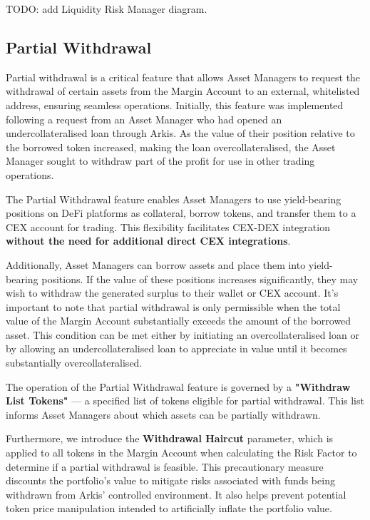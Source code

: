 \documentclass[conference]{IEEEtran}
\begin{document}
TODO: add Liquidity Risk Manager diagram.


\subsection{Partial Withdrawal}

Partial withdrawal is a critical feature that allows Asset Managers to request the withdrawal of certain assets from the Margin Account to an external, whitelisted address, ensuring seamless operations. Initially, this feature was implemented following a request from an Asset Manager who had opened an undercollateralised loan through Arkis. As the value of their position relative to the borrowed token increased, making the loan overcollateralised, the Asset Manager sought to withdraw part of the profit for use in other trading operations.

The Partial Withdrawal feature enables Asset Managers to use yield-bearing positions on DeFi platforms as collateral, borrow tokens, and transfer them to a CEX account for trading. This flexibility facilitates CEX-DEX integration \textbf{without the need for additional direct CEX integrations}.

Additionally, Asset Managers can borrow assets and place them into yield-bearing positions. If the value of these positions increases significantly, they may wish to withdraw the generated surplus to their wallet or CEX account. It's important to note that partial withdrawal is only permissible when the total value of the Margin Account substantially exceeds the amount of the borrowed asset. This condition can be met either by initiating an overcollateralised loan or by allowing an undercollateralised loan to appreciate in value until it becomes substantially overcollateralised.

The operation of the Partial Withdrawal feature is governed by a \textbf{"Withdraw List Tokens"} — a specified list of tokens eligible for partial withdrawal. This list informs Asset Managers about which assets can be partially withdrawn.

Furthermore, we introduce the \textbf{Withdrawal Haircut} parameter, which is applied to all tokens in the Margin Account when calculating the Risk Factor to determine if a partial withdrawal is feasible. This precautionary measure discounts the portfolio's value to mitigate risks associated with funds being withdrawn from Arkis’ controlled environment. It also helps prevent potential token price manipulation intended to artificially inflate the portfolio value.
\end{document}
